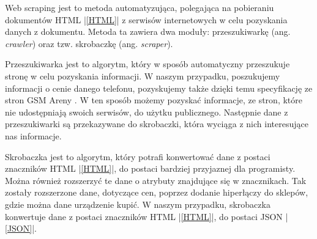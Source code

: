 Web scraping \cite{web_scraping} jest to metoda automatyzująca, polegająca na pobieraniu dokumentów HTML |\ref{HTML}| z serwisów internetowych w celu pozyskania danych z dokumentu. Metoda ta zawiera dwa moduły: przeszukiwarkę (ang. \textit{crawler}) oraz tzw. skrobaczkę (ang. \textit{scraper}).

Przeszukiwarka jest to algorytm, który w sposób automatyczny przeszukuje stronę w celu pozyskania informacji. W naszym przypadku, poszukujemy informacji o cenie danego telefonu, pozyskujemy także dzięki temu specyfikację ze stron GSM Areny \cite{gsm_arena}. W ten sposób możemy pozyskać informacje, ze stron, które nie udostępniają swoich serwisów, do użytku publicznego. Następnie dane z przeszukiwarki są przekazywane do skrobaczki, która wyciąga z nich interesujące nas informacje.

Skrobaczka jest to algorytm, który potrafi konwertować dane z postaci znaczników HTML |\ref{HTML}|, do postaci bardziej przyjaznej dla programisty. Można również rozszerzyć te dane o atrybuty znajdujące się w znacznikach. Tak zostały rozszerzone dane, dotyczące cen, poprzez dodanie hiperłączy do sklepów, gdzie można dane urządzenie kupić. W naszym przypadku, skrobaczka konwertuje dane z postaci znaczników HTML |\ref{HTML}|, do postaci JSON |\ref{JSON}|.
